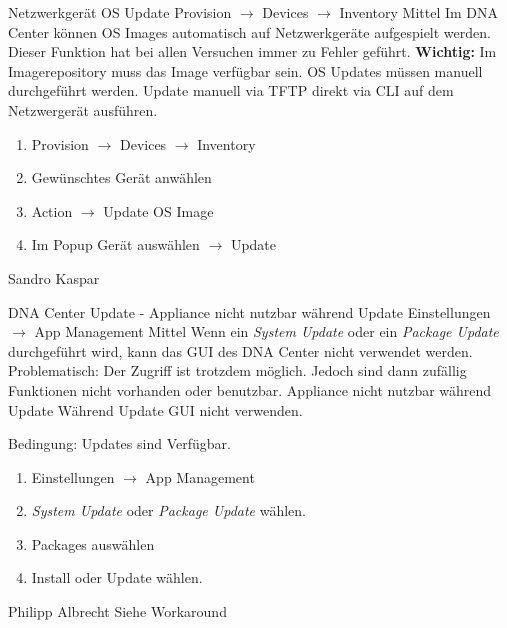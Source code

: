 \bugreport
{Netzwerkgerät OS Update}
{Provision $\rightarrow$ Devices $\rightarrow$ Inventory}
{Mittel}
{Im DNA Center können OS Images automatisch auf Netzwerkgeräte aufgespielt werden. Dieser Funktion hat bei allen Versuchen immer zu Fehler geführt. 
\textbf{Wichtig:}
Im Imagerepository muss das Image verfügbar sein. }
{OS Updates müssen manuell durchgeführt werden.}
{Update manuell via TFTP direkt via CLI auf dem Netzwergerät ausführen.}
{
	\begin{enumerate}
		\item Provision $\rightarrow$ Devices $\rightarrow$ Inventory
		\item Gewünschtes Gerät anwählen 
		\item Action $\rightarrow$ Update OS Image
		\item Im Popup Gerät auswählen $\rightarrow$ Update
	\end{enumerate}
}
{Sandro Kaspar}
{}

\bugreport
{DNA Center Update - Appliance nicht nutzbar während Update}
{Einstellungen $\rightarrow$ App Management}
{Mittel}
{Wenn ein \textit{System Update} oder ein \textit{Package Update} durchgeführt wird, kann das GUI des DNA Center nicht verwendet werden. Problematisch: Der Zugriff ist trotzdem möglich. Jedoch sind dann zufällig Funktionen nicht vorhanden oder benutzbar.}
{Appliance nicht nutzbar während Update}
{Während Update GUI nicht verwenden.}
{
	Bedingung: Updates sind Verfügbar.
	\begin{enumerate}
		\item Einstellungen $\rightarrow$ App Management
		\item \textit{System Update} oder \textit{Package Update} wählen.
		\item Packages auswählen
		\item Install oder Update wählen.
	\end{enumerate}
}
{Philipp Albrecht}
{Siehe Workaround}


